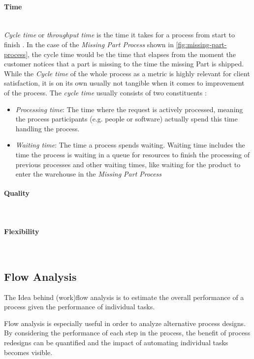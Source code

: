\paragraph{Time}~\\
\textit{Cycle time} or \textit{throughput time} is the time it takes for a process from start to finish \cite{Six-sigma-terms}. In the case of the \textit{Missing Part Process} shown in \ref{fig:missing-part-process}, the cycle time would be the time that elapses from the moment the customer notices that a part is missing to the time the missing Part is shipped. While the \textit{Cycle time} of the whole process as a metric is highly relevant for client satisfaction, it is on its own usually not tangible when it comes to improvement of the process. The \textit{cycle time} usually consists of two constituents \cite{fundamentals}:
\begin{itemize}
	\item \textit{Processing time}: The time where the request is actively processed, meaning the process participants (e.g. people or software) actually spend this time handling the process. 
	\item \textit{Waiting time}: The time a process spends waiting. Waiting time includes the time the process is waiting in a queue for resources to finish the processing of previous processes and other waiting times, like waiting for the product to enter the warehouse in the \textit{Missing Part Process}
\end{itemize}
\paragraph{Quality}~\\

\paragraph{Flexibility}~\\

\subsection{Flow Analysis}
The Idea behind (work)flow analysis is to estimate the overall performance of a process given the performance of individual tasks.  

Flow analysis is especially useful in order to analyze alternative process designs. By considering the performance of each step in the process, the benefit of process redesigns can be quantified and the impact of automating individual tasks becomes visible.


